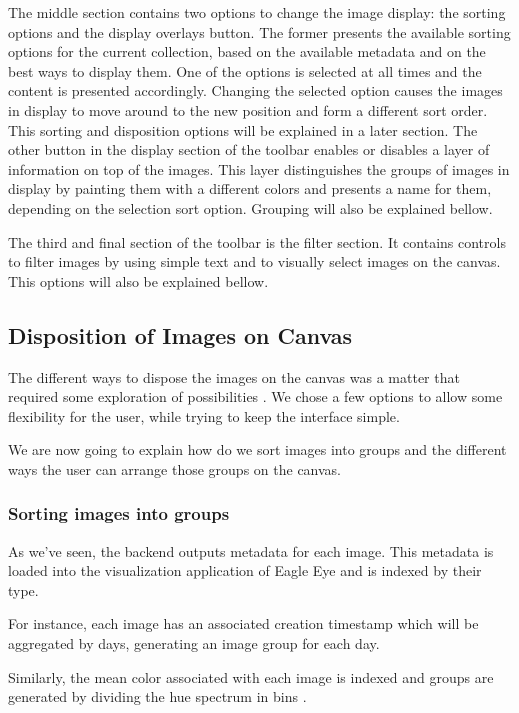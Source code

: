 The middle section contains two options to change the image display: the sorting options and the display overlays button. The former presents the available sorting options for the current collection, based on the available metadata and on the best ways to display them. One of the options is selected at all times and the content is presented accordingly. Changing the selected option causes the images in display to move around to the new position and form a different sort order. This sorting and disposition options will be explained in a later section.
The other button in the display section of the toolbar enables or disables a layer of information on top of the images. This layer distinguishes the groups of images in display by painting them with a different colors and presents a name for them, depending on the selection sort option. Grouping will also be explained bellow. 

The third and final section of the toolbar is the filter section. It contains controls to filter images by using simple text and to visually select images on the canvas. This options will also be explained bellow.

\subsection{Disposition of Images on Canvas}
\label{sub:dispositions}

The different ways to dispose the images on the canvas was a matter that required some exploration of possibilities . We chose a few options to allow some flexibility for the user, while trying to keep the interface simple.

We are now going to explain how do we sort images into groups and the different ways the user can arrange those groups on the canvas.

\subsubsection{Sorting images into groups}

As we've seen, the backend outputs metadata for each image. This metadata is loaded into the visualization application of Eagle Eye and is indexed by their type.

For instance, each image has an associated creation timestamp which will be aggregated by days, generating an image group for each day.

Similarly, the mean color associated with each image is indexed and groups are generated by dividing the hue spectrum in bins .

